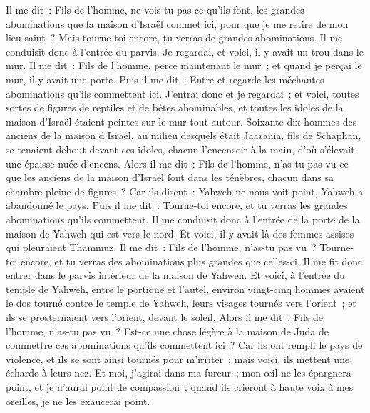 \begin{multicols}{2}
Il me dit~: Fils de l'homme, ne vois-tu pas ce qu'ils font, les grandes abominations que la maison d'Israël commet ici, pour que je me retire de mon lieu saint~? Mais tourne-toi encore, tu verras de grandes abominations.
Il me conduisit donc à l'entrée du parvis. Je regardai, et voici, il y avait un trou dans le mur.
Il me dit~: Fils de l'homme, perce maintenant le mur~; et quand je perçai le mur, il y avait une porte.
Puis il me dit~: Entre et regarde les méchantes abominations qu'ils commettent ici.
J'entrai donc et je regardai~; et voici, toutes sortes de figures de reptiles et de bêtes abominables, et toutes les idoles de la maison d'Israël étaient peintes sur le mur tout autour.
Soixante-dix hommes des anciens de la maison d'Israël, au milieu desquels était Jaazania, fils de Schaphan, se tenaient debout devant ces idoles, chacun l'encensoir à la main, d'où s'élevait une épaisse nuée d'encens.
Alors il me dit~: Fils de l'homme, n'as-tu pas vu ce que les anciens de la maison d'Israël font dans les ténèbres, chacun dans sa chambre pleine de figures~? Car ils disent~: Yahweh ne nous voit point, Yahweh a abandonné le pays.
Puis il me dit~: Tourne-toi encore, et tu verras les grandes abominations qu'ils commettent.
Il me conduisit donc à l'entrée de la porte de la maison de Yahweh qui est vers le nord. Et voici, il y avait là des femmes assises qui pleuraient Thammuz.
Il me dit~: Fils de l'homme, n'as-tu pas vu~? Tourne-toi encore, et tu verras des abominations plus grandes que celles-ci.
Il me fit donc entrer dans le parvis intérieur de la maison de Yahweh. Et voici, à l'entrée du temple de Yahweh, entre le portique et l'autel, environ vingt-cinq hommes avaient le dos tourné contre le temple de Yahweh, leurs visages tournés vers l'orient~; et ils se prosternaient vers l'orient, devant le soleil.
Alors il me dit~: Fils de l'homme, n'as-tu pas vu~? Est-ce une chose légère à la maison de Juda de commettre ces abominations qu'ils commettent ici~? Car ils ont rempli le pays de violence, et ils se sont ainsi tournés pour m'irriter~; mais voici, ils mettent une écharde à leurs nez.
Et moi, j'agirai dans ma fureur~; mon œil ne les épargnera point, et je n'aurai point de compassion~; quand ils crieront à haute voix à mes oreilles, je ne les exaucerai point.

\end{multicols}
